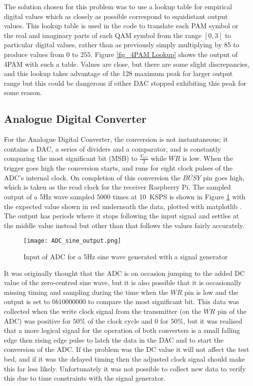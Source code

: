 \documentclass[../main.tex]{subfiles}
\begin{document}
The solution chosen for this problem was to use a lookup table for empirical digital values which as closely as possible correspond to equidistant output values.
This lookup table is used in the code to translate each PAM symbol or the real and imaginary parts of each QAM symbol from the range $[0, 3]$ to particular digital values, rather than as previously simply multiplying by 85 to produce values from $0$ to $255$.
Figure \ref{fig_4PAM Lookup} shows the output of 4PAM with such a table.
Values are close, but there are some slight discrepancies, and this lookup takes advantage of the 128 maximum peak for larger output range but this could be dangerous if either DAC stopped exhibiting this peak for some reason.

\subsection{Analogue Digital Converter}

For the Analogue Digital Converter, the conversion is not instantaneous; it contains a DAC, a series of dividers and a comparator, and is constantly comparing the most significant bit (MSB) to $\frac{V_{ref}}{2}$ while $\overline{WR}$ is low.
When the trigger goes high the conversion starts, and runs for eight clock pulses of the ADC's internal clock.
On completion of this conversion the $\overline{BUSY}$ pin goes high, which is taken as the read clock for the receiver Raspberry Pi.
The sampled output of a 5Hz wave sampled 5000 times at \SI{10}{KSPS} is shown in Figure \ref{fig_ADC Input} with the expected value shown in red underneath the data, plotted with matplotlib \cite{lib_matplotlib}.
The output has periods where it stops following the input signal and settles at the middle value instead but other than that follows the values fairly accurately.\\

\begin{figure}[ht]
	\centering
	\texttt{[image: ADC\_sine\_output.png]}
	\caption{Input of ADC for a 5Hz sine wave generated with a signal generator}
	\label{fig_ADC Input}
\end{figure}

It was originally thought that the ADC is on occasion jumping to the added DC value of the zero-centred sine wave, but it is also possible that it is occasionally missing timing and sampling during the time when the $\overline{WR}$ pin is low and the output is set to $0b10000000$ to compare the most significant bit.
This data was collected when the write clock signal from the transmitter (on the $\overline{WR}$ pin of the ADC) was positive for $50\%$ of the clock cycle and 0 for $50\%$, but it was realised that a more logical signal for the operation of both converters is a small falling edge then rising edge pulse to latch the data in the DAC and to start the conversion of the ADC.
If the problem was the DC value it will not affect the test bed, and if it was the delayed timing then the adjusted clock signal should make this far less likely.
Unfortunately it was not possible to collect new data to verify this due to time constraints with the signal generator.
\end{document}
